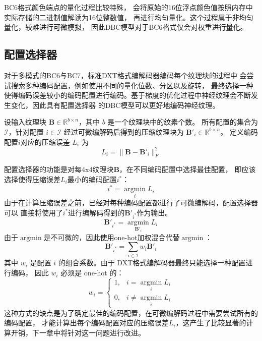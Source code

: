 BC6格式颜色端点的量化过程比较特殊，
会将原始的16位浮点颜色值按照内存中实际存储的二进制值解读为16位整数值，
再进行均匀量化。这个过程属于非均匀量化，较难进行可微模拟，
因此DBC模型对于BC6格式仅会对权重进行量化。

\subsection{配置选择器}

对于多模式的BC6与BC7，标准DXT格式编解码器编码每个纹理块的过程中
会尝试搜索多种编码配置，例如使用不同的量化位数、分区以及旋转，
最终选择一种使得编码误差较小的编码配置进行编码。基于梯度的优化过程中神经纹理会不断发生变化，因此具有配置选择器
的DBC模型可以更好地编码神经纹理。

设输入纹理块 $\mathbf{B}\in\mathbb{R}^{b\times n}$，其中 $b$ 是一个纹理块中的纹素个数。
所有配置的集合为 $\mathcal{I}$，针对配置 $i\in\mathcal{I}$ 经过可微编解码后得到的压缩纹理块为 $\mathbf{B}'_i\in\mathbb{R}^{b\times n}$。
定义编码配置$i$对应的压缩误差 $L_i$ 为
\begin{equation}
L_i=\|\mathbf{B}-\mathbf{B}'_i\|_F^2
\end{equation}

配置选择器的功能是对每4x4纹理块$\mathbf{B}$，在不同编码配置中选择最佳配置，
即应该选择使得压缩误差$L_i$最小的编码配置$i^*$：
\begin{equation}
    i^*=\mathop{\arg\min}\limits_{i} L_i
\end{equation}
由于在计算压缩误差之前，已经对每种编码配置都进行了可微编解码，配置选择器可以
直接将使用了$i^*$进行编解码得到的$\mathbf{B}'_{i^*}$作为输出。
\begin{equation}
    \mathbf{B}'_{i^*}=\mathop{\arg\min}\limits_{\mathbf{B}'_i} L_i
\end{equation}
由于$\mathop{\arg\min}$是不可微的，因此使用one-hot加权混合代替$\mathop{\arg\min}$：
\begin{equation}
\mathbf{B}'_{i^*}=\sum_{i\in\mathcal{I}} w_i\mathbf{B}'_i
\end{equation}
其中 $w_i$ 是配置 $i$ 的组合系数。由于
DXT格式编解码器最终只能选择一种配置进行编码，
因此 $w_i$ 必须是 one-hot 的：
\begin{equation}
    w_i =\left\{\begin{matrix}
        1,& i=\mathop{\arg\min}\limits_{i} L_i
        \\0,& i\ne\mathop{\arg\min}\limits_{i} L_i
        \end{matrix}\right.
\end{equation}
这种方式的缺点是为了确定最佳的编码配置，在可微编解码过程中需要尝试所有的编码配置，
才能计算出每个编码配置对应的压缩误差$L_i$，这产生了比较显著的计算开销，下一章中将针对这一问题进行改进。

